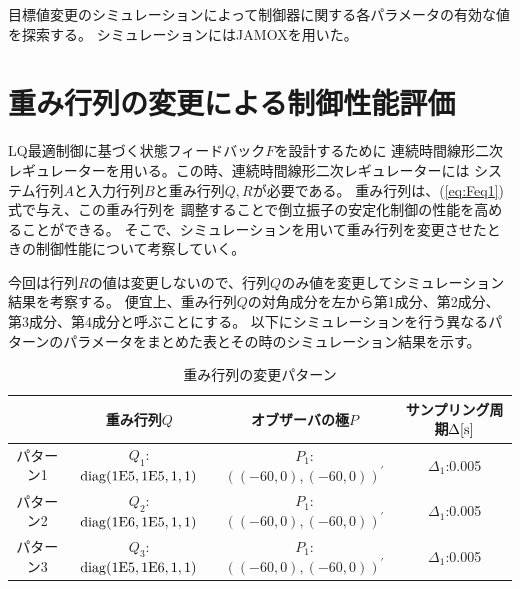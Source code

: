 目標値変更のシミュレーションによって制御器に関する各パラメータの有効な値を探索する。 シミュレーションにはJAMOXを用いた。
\section{重み行列の変更による制御性能評価}
	LQ最適制御に基づく状態フィードバック$F$を設計するために
	連続時間線形二次レギュレーターを用いる。この時、連続時間線形二次レギュレーターには
	システム行列$A$と入力行列$B$と重み行列$Q,R$が必要である。
	重み行列は、(\ref{eq:Feq1})式で与え、この重み行列を
	調整することで倒立振子の安定化制御の性能を高めることができる。
	そこで、シミュレーションを用いて重み行列を変更させたときの制御性能について考察していく。
	\par
	今回は行列$R$の値は変更しないので、行列$Q$のみ値を変更してシミュレーション結果を考察する。
	便宜上、重み行列$Q$の対角成分を左から第1成分、第2成分、第3成分、第4成分と呼ぶことにする。
	以下にシミュレーションを行う異なるパターンのパラメータをまとめた表とその時のシミュレーション結果を示す。
	\begin{table}[htb]
		\begin{center}
			\caption{重み行列の変更パターン}
			\begin{tabular}{|c|c|c|c|}\hline
				& 重み行列$Q$ & オブザーバの極$P$ & サンプリング周期$\Delta[\rm{s}]$ \\ \hline\hline
				パターン1 & $Q_1$:$\rm{diag}(1E5,1E5,1,1)$ & $P_1$:$((-60,0),(-60,0))^{'}$ & $\Delta_1$:0.005 \\ \hline
				パターン2 & $Q_2$:$\rm{diag}(1E6,1E5,1,1)$ & $P_1$:$((-60,0),(-60,0))^{'}$ & $\Delta_1$:0.005 \\ \hline
				パターン3 & $Q_3$:$\rm{diag}(1E5,1E6,1,1)$ & $P_1$:$((-60,0),(-60,0))^{'}$ & $\Delta_1$:0.005 \\ \hline
			\end{tabular}
		\end{center}
		\label{table:QRF}
	\end{table}
	
